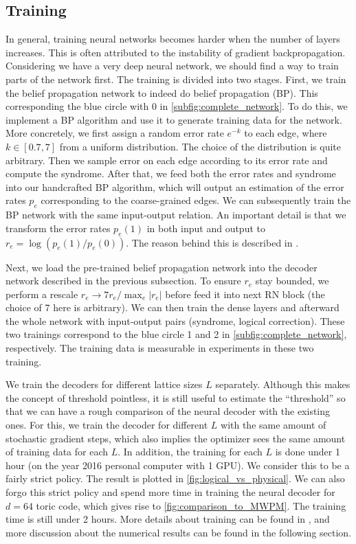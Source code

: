\subsection{Training}
\label{subsec:training}
In general, training neural networks becomes harder when the number of layers increases.
This is often attributed to the instability of gradient backpropagation.
Considering we have a very deep neural network, we should find a way to train parts of the network first.
The training is divided into two stages.
First, we train the belief propagation network to indeed do belief propagation (BP).
This corresponding the blue circle with 0 in \autoref{subfig:complete_network}.
To do this, we implement a BP algorithm and use it to generate training data for the network.
More concretely, we first assign a random error rate $e^{-k}$ to each edge, where $k\in [0.7,7]$ from a uniform distribution.
The choice of the distribution is quite arbitrary.
Then we sample error on each edge according to its error rate and compute the syndrome.
After that, we feed both the error rates and syndrome into our handcrafted BP algorithm, which will output an estimation of the error rates $p_e$ corresponding to the coarse-grained edges.
We can subsequently train the BP network with the same input-output relation.
An important detail is that we transform the error rates $p_e(1)$ in both input and output to $r_e=\log \left(p_e(1)/p_e(0)\right)$.
The reason behind this is described in . 

Next, we load the pre-trained belief propagation network into the decoder network described in the previous subsection.
To ensure $r_e$ stay bounded, we perform a rescale $r_e \rightarrow 7r_e/\max_e |r_e|$ before feed it into next RN block (the choice of 7 here is arbitrary).
We can then train the dense layers and afterward the whole network with input-output pairs (syndrome, logical correction).
These two trainings correspond to the blue circle 1 and 2 in \autoref{subfig:complete_network}, respectively.
The training data is measurable in experiments in these two training.

We train the decoders for different lattice sizes $L$ separately.
Although this makes the concept of threshold pointless, it is still useful to estimate the ``threshold'' so that we can have a rough comparison of the neural decoder with the existing ones.
For this, we train the decoder for different $L$ with the same amount of stochastic gradient steps, which also implies the optimizer sees the same amount of training data for each $L$.
In addition, the training for each $L$ is done under 1 hour (on the year 2016 personal computer with 1 GPU).
We consider this to be a fairly strict policy.
The result is plotted in \autoref{fig:logical_vs_physical}.
We can also forgo this strict policy and spend more time in training the neural decoder for $d=64$ toric code, which gives rise to \autoref{fig:comparison_to_MWPM}.
The training time is still under 2 hours.
More details about training can be found in , and more discussion about the numerical results can be found in the following section.
